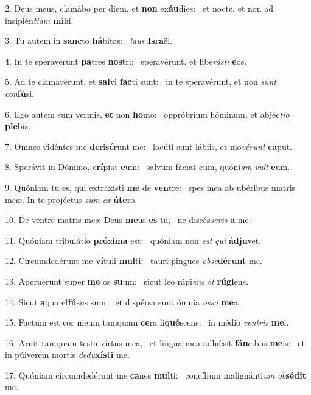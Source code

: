 2. Deus meus, clamábo per diem, et \textbf{non} ex\textbf{áu}dies: \ast\  et nocte, et non ad insipién\textit{ti}\textit{am} \textbf{mi}hi.\

3. Tu autem in \textbf{sanc}to \textbf{há}bitas: \ast\  \textit{laus} \textbf{Is}\textbf{ra}ël.\

4. In te speravérunt \textbf{pa}tres \textbf{nos}tri: \ast\  speravérunt, et libe\textit{rás}\textit{ti} \textbf{e}os.\

5. Ad te clamavérunt, et \textbf{sal}vi \textbf{fac}ti sunt: \ast\  in te speravérunt, et non \textit{sunt} \textit{con}\textbf{fú}si.\

6. Ego autem sum vermis, \textbf{et} non \textbf{ho}mo: \ast\  oppróbrium hóminum, et abjéc\textit{ti}\textit{o} \textbf{ple}bis.\

7. Omnes vidéntes me \textbf{de}ri\textbf{sé}runt me: \ast\  locúti sunt lábiis, et mo\textit{vé}\textit{runt} \textbf{ca}put.\

8. Sperávit in Dómino, e\textbf{rí}piat \textbf{e}um: \ast\  salvum fáciat eum, quóni\textit{am} \textit{vult} \textbf{e}um.\

9. Quóniam tu es, qui extraxísti \textbf{me} de \textbf{ven}tre: \ast\  spes mea ab ubéribus matris meæ. In te projéctus \textit{sum} \textit{ex} \textbf{ú}\textbf{te}ro.\

10. De ventre matris meæ Deus \textbf{me}us \textbf{es} tu, \ast\  ne discés\textit{se}\textit{ris} \textbf{a} me:\

11. Quóniam tribulátio \textbf{pró}xi\textbf{ma} est: \ast\  quóniam non \textit{est} \textit{qui} \textbf{ád}\textbf{ju}vet.\

12. Circumdedérunt me \textbf{ví}tuli \textbf{mul}ti: \ast\  tauri pingues \textit{ob}\textit{se}\textbf{dé}\textbf{runt} me.\

13. Aperuérunt super \textbf{me} os \textbf{su}um: \ast\  sicut leo rápi\textit{ens} \textit{et} \textbf{rú}\textbf{gi}ens.\

14. Sicut \textbf{a}qua ef\textbf{fú}sus sum: \ast\  et dispérsa sunt ómnia \textit{os}\textit{sa} \textbf{me}a.\

15. Factum est cor meum tamquam \textbf{ce}ra li\textbf{qué}scens: \ast\  in médio \textit{ven}\textit{tris} \textbf{me}i.\

16. Aruit tamquam testa virtus mea, \dag\  et lingua mea adhǽsit \textbf{fáu}cibus \textbf{me}is: \ast\  et in púlverem mortis \textit{de}\textit{du}\textbf{xís}\textbf{ti} me.\

17. Quóniam circumdedérunt me \textbf{ca}nes \textbf{mul}ti: \ast\  concílium malignánti\textit{um} \textit{ob}\textbf{sé}\textbf{dit} me.\

